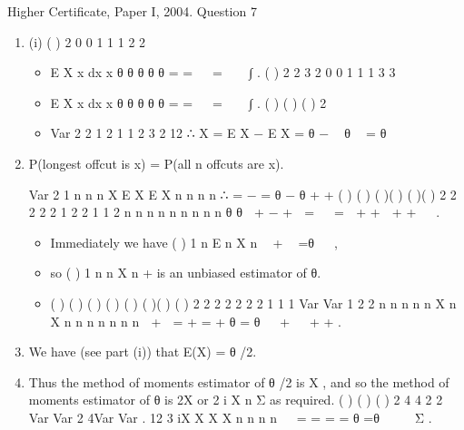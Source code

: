 \documentclass[a4paper,12pt]{article}
\begin{document}
Higher Certificate, Paper I, 2004. Question 7

\begin{enumerate}
\item (i) ( ) 2
0
0
1 1 1
2 2

\begin{itemize}
    \item E X x dx x
θ
θ θ
θ θ
= =   =   ∫ .
( ) 2
2 3 2
0
0
1 1 1
3 3
\item E X x dx x
θ
θ θ
θ θ
= =   =   ∫ .
( ) ( ) { ( )}
2
\item Var 2 2 1 2 1 1 2
3 2 12
∴ X = E X − E X = θ −  θ  = θ
 
\end{itemize}
\item  P(longest offcut is \leq x) = P(all n offcuts are \leq x).
Var
2 1 n n n
X E X E X n n
n n
∴ = − = θ − θ
+ +
( ) ( )
( )( ) ( )( )
2 2
2
2 2
1 2
2 1 1 2
n n n n n
n n n n
θ θ
 + − + 
=   =
 + +  + +  
.
\begin{itemize}
\item Immediately we have ( )
1
n
E n X
n
 +  =θ
 
, 

\item so ( )
1
n
n X
n
+ is an unbiased estimator of θ.


\item ( ) ( )
( ) ( ) ( )
( )( ) ( )
2 2 2 2
2 2 2
1 1 1 Var Var
1 2 2 n
n n n n X n X
n n n n n n n
 +  = + = + θ = θ   +   + +
.
\end{itemize}
\item We have (see part (i)) that E(X) = θ /2. 
\item Thus the method of moments estimator
of θ /2 is X , and so the method of moments estimator of θ is 2X or 2
i X
n Σ as
required.
( ) ( ) ( )
2 4 4 2 2 Var Var 2 4Var Var .
12 3 iX X X X
n n n n
  = = = = θ =θ  
  Σ .
\end{enumerate}
\end{document}
